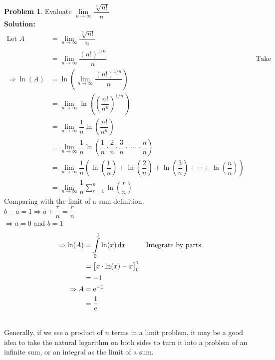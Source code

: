 \documentclass[14]{article}
\theoremstyle{definition}
\newtheorem{prob}{Problem}
\theoremstyle{case}
\begin{document}
\begin{prob}
Evaluate $\lim\limits_{n \to \infty} \dfrac{\sqrt[n]{n!}}{n}$\\
\textbf{Solution:}
\begin{align*}
\text{Let } A &= \lim\limits_{n \to \infty} \dfrac{\sqrt[n]{n!}}{n}\\
&= \lim\limits_{n \to \infty} \dfrac{(n!)^{1/n}}{n} && \text{Take natural log on both sides}\\
\Rightarrow \ln(A) &= \ln\left( \lim\limits_{n \to \infty} \dfrac{(n!)^{1/n}}{n} \right)\\
&= \lim\limits_{n \to \infty} \ln \left( \left( \dfrac{n!}{n^n} \right)^{1/n} \right)\\
&= \lim\limits_{n \to \infty} \dfrac1n \ln\left( \dfrac{n!}{n^n} \right)\\
&= \lim\limits_{n \to \infty} \dfrac1n \ln\left( \dfrac1n \cdot \dfrac2n \cdot \dfrac3n \cdot \; \cdots \; \cdot \dfrac{n}n \right)\\
&= \lim\limits_{n \to \infty} \dfrac1n \left( \ln\left( \dfrac1n \right) + \ln\left( \dfrac2n \right) + \ln\left( \dfrac3n \right) + \cdots + \ln\left( \dfrac{n}{n} \right)  \right)\\
&= \lim\limits_{n \to \infty} \dfrac1n \sum\limits_{r=1}^n \ln\left( \dfrac{r}{n} \right)
\end{align*}
Comparing with the limit of a sum definition.\\
$b - a = 1 \Rightarrow a + \dfrac{r}{n} = \dfrac{r}{n}$\\
$\Rightarrow a = 0$ and $b = 1$
\begin{align*}
\Rightarrow \ln(A) &= \int\limits_0^1 \ln(x) \dif x && \text{Integrate by parts}\\
&= \left[ x \cdot \ln(x) - x \right]_0^1\\
&= -1\\
\Rightarrow A &= {\rm e}^{-1}\\
&= \dfrac1{\rm e}
\end{align*}
\end{prob}\text{}\\
Generally, if we see a product of $n$ terms in a limit problem, it may be a good idea to take the natural logarithm on both sides to turn it into a problem of an infinite sum, or an integral as the limit of a sum.
\pagebreak
\end{document}
